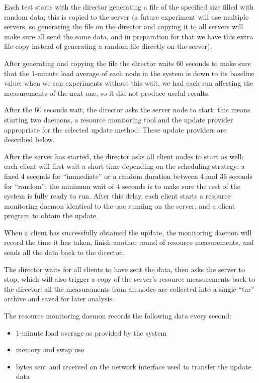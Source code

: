 \documentclass[a4paper,12pt]{article}
\begin{document}
Each test starts with the director generating a file of the specified size
filled with random data; this is copied to the server (a future experiment
will use multiple servers, so generating the file on the director and
copying it to all servers will make sure all send the same data, and
in preparation for that we have this extra file copy instead of generating
a random file directly on the server).

After generating and copying the file the director waits 60 seconds to
make sure that the 1-minute load average of each node in the system is
down to its baseline value; when we ran experiments without this wait,
we had each run affecting the measurements of the next one, so it did
not produce useful results.

After the 60 seconds wait, the director asks the server node to start:
this means starting two daemons, a resource monitoring tool and the
update provider appropriate for the selected update method.  These
update providers are described below.

After the server has started, the director asks all client nodes to
start as well: each client will first wait a short time depending on
the scheduling strategy: a fixed 4 seconds for ``immediate'' or a
random duration between 4 and 36 seconds for ``random''; the minimum
wait of 4 seconds is to make sure the rest of the system is fully
ready to run. After this delay, each client starts a resource monitoring
daemon identical to the one running on the server, and a client
program to obtain the update.

When a client has successfully obtained the update, the monitoring
daemon will record the time it has taken, finish another round of
resource measurements, and sends all the data back to the director.

The director waits for all clients to have sent the data, then asks the
server to stop, which will also trigger a copy of the server's resource
measurements back to the director: all the measurements from all nodes
are collected into a single ``tar'' archive and saved for later analysis.

The resource monitoring daemon records the following data every second:

\begin{itemize}
\item 1-minute load average as provided by the system
\item memory and swap use
\item bytes sent and received on the network interface used to
transfer the update data
\end{itemize}
\end{document}
